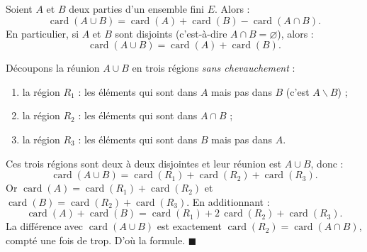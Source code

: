 \documentclass[11pt]{article}
\newcommand{\cle}[1]{{\popxbold\color{popdark}#1}}
\def\setminus{\mathbin{\backslash}}\let\smallsetminus\setminus
\begin{document}
\begin{propriete}
Soient $A$ et $B$ deux parties d'un ensemble fini $E$. Alors :
\[ \operatorname{card}(A \cup B) = \operatorname{card}(A) + \operatorname{card}(B) - \operatorname{card}(A \cap B). \]
En particulier, si $A$ et $B$ sont \cle{disjoints} (c'est-à-dire $A \cap B = \varnothing$), alors :
\[ \operatorname{card}(A \cup B) = \operatorname{card}(A) + \operatorname{card}(B). \]
\end{propriete}

\begin{experience}
Découpons la réunion $A \cup B$ en trois régions \emph{sans chevauchement} :
\begin{enumerate}
\item la région $R_1$ : les éléments qui sont dans $A$ mais pas dans $B$ (c'est $A \setminus B$) ;
\item la région $R_2$ : les éléments qui sont dans $A \cap B$ ;
\item la région $R_3$ : les éléments qui sont dans $B$ mais pas dans $A$.
\end{enumerate}
Ces trois régions sont deux à deux disjointes et leur réunion est $A \cup B$, donc :
\[ \operatorname{card}(A \cup B) = \operatorname{card}(R_1) + \operatorname{card}(R_2) + \operatorname{card}(R_3). \]
Or $\operatorname{card}(A) = \operatorname{card}(R_1) + \operatorname{card}(R_2)$ et $\operatorname{card}(B) = \operatorname{card}(R_2) + \operatorname{card}(R_3)$. En additionnant :
\[ \operatorname{card}(A) + \operatorname{card}(B) = \operatorname{card}(R_1) + 2\,\operatorname{card}(R_2) + \operatorname{card}(R_3). \]
La différence avec $\operatorname{card}(A \cup B)$ est exactement $\operatorname{card}(R_2) = \operatorname{card}(A \cap B)$, compté une fois de trop. D'où la formule. $\blacksquare$
\end{experience}
\end{document}
